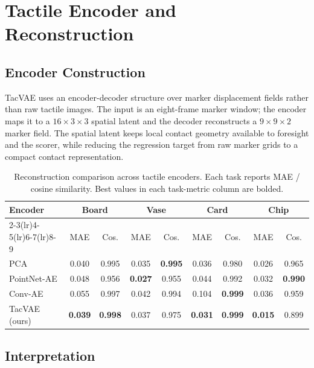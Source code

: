 \documentclass[10pt,letterpaper]{article}
\newcommand{\tabstyle}{\small\setlength{\tabcolsep}{3pt}\renewcommand{\arraystretch}{1.15}}
\begin{document}
\section{Tactile Encoder and Reconstruction}
\label{sec:encoder}

\subsection{Encoder Construction}

TacVAE uses an encoder-decoder structure over marker displacement fields rather
than raw tactile images. The input is an eight-frame marker window; the encoder
maps it to a $16 \times 3 \times 3$ spatial latent and the decoder reconstructs
a $9 \times 9 \times 2$ marker field. The spatial latent keeps local contact
geometry available to foresight and the scorer, while reducing the regression
target from raw marker grids to a compact contact representation.

\begin{table}[t]
\caption{Reconstruction comparison across tactile encoders. Each task reports
MAE / cosine similarity. Best values in each task-metric column are bolded.}
\label{tab:encoder_recon}
\centering
\tabstyle
\begin{tabular}{lcccccccc}
\toprule
\multirow{2}{*}{Encoder} &
\multicolumn{2}{c}{Board} &
\multicolumn{2}{c}{Vase} &
\multicolumn{2}{c}{Card} &
\multicolumn{2}{c}{Chip}\\
\cmidrule(lr){2-3}\cmidrule(lr){4-5}\cmidrule(lr){6-7}\cmidrule(lr){8-9}
& MAE & Cos.
& MAE & Cos.
& MAE & Cos.
& MAE & Cos.\\
\midrule
PCA & 0.040 & 0.995 & 0.035 & \textbf{0.995} & 0.036 & 0.980 & 0.026 & 0.965\\
PointNet-AE & 0.048 & 0.956 & \textbf{0.027} & 0.955 & 0.044 & 0.992 & 0.032 & \textbf{0.990}\\
Conv-AE & 0.055 & 0.997 & 0.042 & 0.994 & 0.104 & \textbf{0.999} & 0.036 & 0.959\\
TacVAE (ours) & \textbf{0.039} & \textbf{0.998} & 0.037 & 0.975 & \textbf{0.031} & \textbf{0.999} & \textbf{0.015} & 0.899\\
\bottomrule
\end{tabular}
\end{table}

\subsection{Interpretation}
\end{document}
